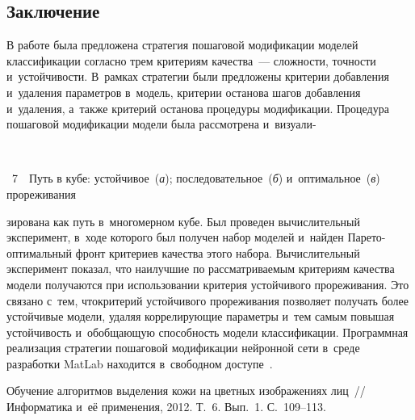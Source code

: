 \begin{multicols}{2}
\section{Заключение}

В работе была предложена стратегия пошаговой модификации моделей
классификации согласно трем критериям качества~--- сложности,
точности и~устойчивости. В~рамках стратегии были предложены критерии
добавления и~удаления параметров в~модель, критерии останова шагов
добавления и~удаления, а~также критерий останова
 процедуры
модификации. Процедура пошаговой модификации модели была рассмотрена
и~визуали-\linebreak\vspace*{-12pt}

\begin{center}  %
\vspace*{1pt}
\mbox{%
 \epsfxsize=77.709mm
 }
\end{center}

\vspace*{-9pt}


\noindent
{{\figurename~7}\ \ \small{Путь в кубе: устойчивое~(\textit{а}); последовательное~(\textit{б})
и~оптимальное~(\textit{в})  прореживания}}





\addtocounter{figure}{1}



\noindent
зирована как путь в~многомерном кубе. Был проведен
вычислительный эксперимент, в~ходе которого был получен набор
моделей и~найден Па\-ре\-то-опти\-маль\-ный фронт критериев качества этого
набора. Вычислительный эксперимент показал, что наилучшие по
рассматриваемым критериям качества модели получаются при
использовании критерия устойчивого прореживания. Это связано с~тем,
что\linebreak критерий устойчивого прореживания позволяет получать более
устойчивые модели, удаляя коррелирующие параметры и~тем самым
повышая устойчивость и~обобщающую способность модели классифика\-ции.
Программная реализация стратегии пошаговой модификации нейронной
сети в~среде разработки MatLab находится в~свободном доступе~\cite{StrategyCode}.



{\small\frenchspacing
 {%
 \begin{thebibliography}{99}
Обучение алгоритмов выделения кожи на цветных изображениях лиц~// Информатика
и~её применения, 2012. Т.~6. Вып.~1. С.~109--113.




\end{thebibliography}}}
\end{multicols}
